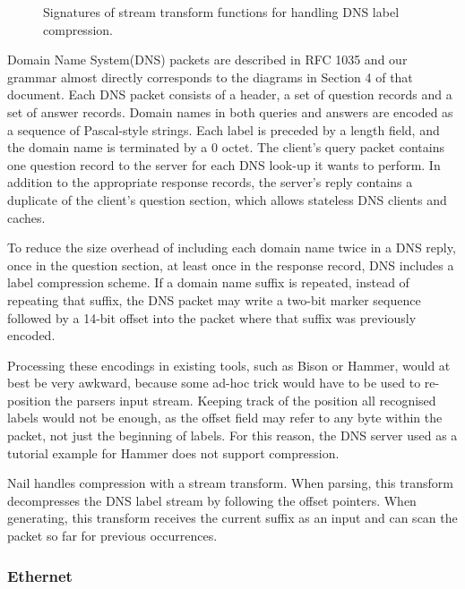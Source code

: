 \begin{figure}
\smaller[0.5]

\caption{Signatures of stream transform functions for handling DNS label compression.}
\label{fig:dns-xform}
\end{figure}

Domain Name System(DNS) packets are described in RFC 1035 and our grammar almost directly
corresponds to the diagrams in Section 4 of that document. Each DNS packet consists of a header, a
set of question records and a set of answer records. Domain names in both queries and answers are
encoded as a sequence of Pascal-style strings. Each label is preceded by a length field, and the
domain name is terminated by a $0$ octet. The client's query packet contains one question
record to the server for each DNS look-up it wants to perform. In addition to the appropriate
response records, the server's reply contains a duplicate of the client's question section, which
allows stateless DNS clients and caches.

To reduce the size overhead of including each domain name twice in a DNS reply, once in the
question section, at least once in the response record, DNS includes a label compression scheme. If
a domain name suffix is repeated, instead of repeating that suffix, the DNS packet may write a
two-bit marker sequence followed by a 14-bit offset into the packet where that suffix was previously
encoded.

Processing these encodings in existing tools, such as Bison or Hammer, would at best be very
awkward, because some ad-hoc trick would have to be used to re-position the parsers input stream.
Keeping track of the position all recognised labels would not be enough, as the offset field may
refer to any byte within the packet, not just the beginning of labels. For this reason, the DNS
server used as a tutorial example for Hammer does not support compression.

Nail handles compression with a stream transform. When parsing, this transform decompresses the DNS
label stream by following the offset pointers. When generating, this transform receives the current
suffix as an input and can scan the packet so far for previous occurrences. 


\subsubsection{Ethernet}
\XXX[TODO]

